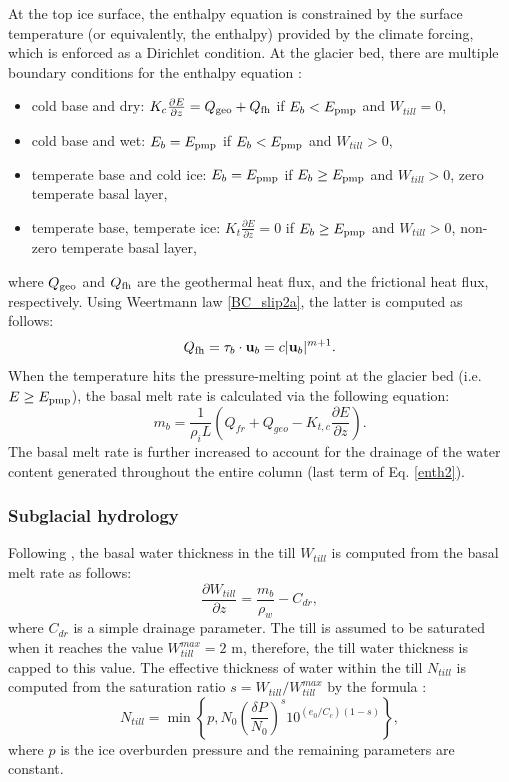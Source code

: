 \documentclass[10pt,twocolumn]{article}
\begin{document}
At the top ice surface, the enthalpy equation is constrained by the surface temperature 
(or equivalently, the enthalpy) provided by the climate forcing, which is enforced as a 
Dirichlet condition.
At the glacier bed, there are multiple boundary conditions for the enthalpy equation
\citep{aschwanden2012enthalpy,wang2020two}:
\begin{itemize}
\item cold base and dry: $K_{c} \frac{\partial E}{ \partial z} = Q_{\rm geo} + Q_{\rm fh}$
if $E_b<E_{\rm pmp}$ and $W_{till} = 0$, 
\item cold base and wet: $ E_b = E_{\rm pmp} $ if $E_b<E_{\rm pmp}$ and $W_{till} > 0$,
\item temperate base and cold ice: $ E_b = E_{\rm pmp} $ if $E_b \ge E_{\rm pmp}$ and $W_{till}> 0$,
zero temperate basal layer,
\item temperate base, temperate ice: $ K_{t} \frac{\partial E}{ \partial z} = 0$ 
if $E_b \ge E_{\rm pmp}$ and $W_{till} > 0$, non-zero temperate basal layer,
\end{itemize}
where $Q_{\rm geo}$ and $Q_{\rm fh}$ are the geothermal heat flux, and the frictional heat flux, 
respectively. Using Weertmann law \eqref{BC_slip2a}, the latter is computed as follows:
\begin{equation}
Q_{\rm fh} = \tau_b \cdot {\bf u}_b = c | {\bf u}_b |^{m+1}. \label{def_Q}
\end{equation}
When the temperature hits the pressure-melting point at the glacier bed 
(i.e. $E \ge E_{\rm pmp}$), the basal melt rate is calculated via the following equation:
\begin{equation}
m_b = \frac{1}{\rho_i L} (Q_{fr}+Q_{geo} - K_{t,c} \frac{\partial E}{ \partial z}). 
\label{basal_melt_rate}
\end{equation}
The basal melt rate is further increased to account for the drainage of the water 
content generated throughout the entire column (last term of Eq. \eqref{enth2}).

\subsubsection{Subglacial hydrology}
\label{phys_subglacial_hydrology}

Following \citet{Bueler2015}, the basal water thickness in the till $W_{till}$ 
is computed from the basal melt rate as follows:
\begin{equation}
\frac{\partial W_{till} }{ \partial z} = \frac{m_b}{\rho_w} - C_{dr},
\label{W_till}
\end{equation}
where $C_{dr}$ is a simple drainage parameter. The till is assumed to be saturated 
when it reaches the value $W_{till}^{max} = 2$ m, therefore, the till water thickness 
is capped to this value. The effective thickness of water within the till $N_{till}$ 
is computed from the saturation ratio $s= W_{till} / W_{till}^{max}$ by the formula
\citep{Bueler2015}:
\begin{equation}
N_{till} = \min \left\{ p, N_0 \left( \frac{\delta P}{N_0} \right)^s 10^{(e_0/C_c)(1-s)} \right\},
\end{equation}
where $p$ is the ice overburden pressure and the remaining parameters are constant. 
 
\end{document}
